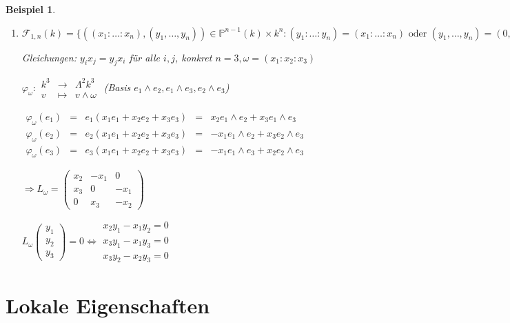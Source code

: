 \documentclass[a4paper, 12pt, numbers=noendperiod, chapterprefix=true]{scrbook}
\theoremstyle{break}
\theoremstyle{nonumberbreak}
\newtheorem{nnBsp}{Beispiel}
\theoremstyle{nonumberplain}
\newcommand{\IP}{\mathbb{P}}%
\newcommand{\calF}{\mathcal{F}}
\begin{document}
\begin{nnBsp}\begin{enumerate}[\underline{$d=1$}:]\item
$\calF_{1,n}(k)=\{((x_1:\ldots :x_n),(y_1,\ldots ,y_n))\in\IP^{n-1}(k)\times k^n : (y_1:\ldots :y_n)=(x_1:\ldots :x_n) \text{ oder } (y_1,\ldots ,y_n)=(0,\ldots ,0)\}$

Gleichungen: $y_ix_j=y_jx_i$ f\"ur alle $i,j$, konkret $n=3, \omega=(x_1:x_2:x_3)$

$\varphi_\omega:\begin{array}{rcl} k^3&\to&\Lambda^2k^3\\v&\mapsto&v\wedge\omega\end{array}$ (Basis $e_1\wedge e_2, e_1\wedge e_3, e_2\wedge e_3$)

$\begin{array}{rclcr}
\varphi_\omega(e_1) &=& e_1 (x_1e_1+x_2e_2+x_3e_3) &=& x_2e_1\wedge e_2 + x_3e_1\wedge e_3\\
\varphi_\omega(e_2) &=& e_2 (x_1e_1+x_2e_2+x_3e_3) &=& -x_1e_1\wedge e_2 + x_3e_2\wedge e_3\\
\varphi_\omega(e_3) &=& e_3 (x_1e_1+x_2e_2+x_3e_3) &=&-x_1e_1\wedge e_3 + x_2e_2\wedge e_3\end{array}$

$\Rightarrow L_\omega = \begin{pmatrix}x_2&-x_1&0\\x_3&0&-x_1\\0&x_3&-x_2\end{pmatrix}$

$L_\omega\begin{pmatrix}y_1\\y_2\\y_3\end{pmatrix}=0 \Leftrightarrow \begin{matrix}x_2y_1-x_1y_2=0\\x_3y_1-x_1y_3=0\\x_3y_2-x_2y_3=0\end{matrix}$
\end{enumerate}\end{nnBsp}

\newpage


\chapter{Lokale Eigenschaften}
\setcounter{section}{14}
\end{document}
